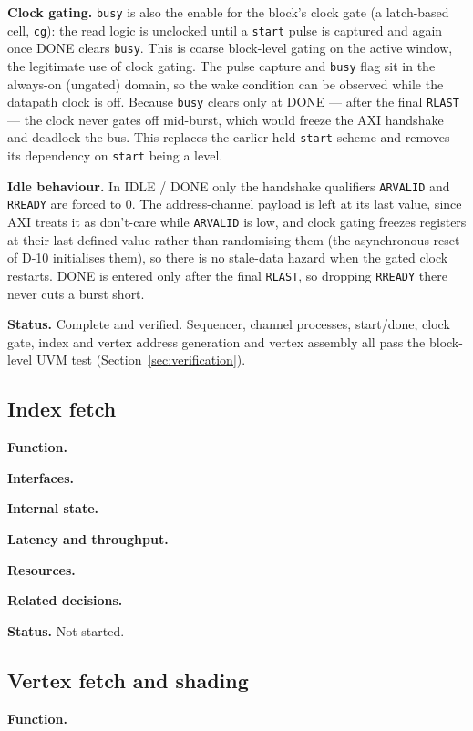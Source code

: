 \documentclass[11pt,a4paper]{article}
\newcommand{\field}[1]{\textbf{#1}\quad}
\begin{document}
\field{Clock gating.} \texttt{busy} is also the enable for the block's clock
gate (a latch-based cell, \texttt{cg}): the read logic is unclocked until a
\texttt{start} pulse is captured and again once DONE clears \texttt{busy}. This
is coarse block-level gating on the active window, the legitimate use of clock
gating. The pulse capture and \texttt{busy} flag sit in the always-on (ungated)
domain, so the wake condition can be observed while the datapath clock is off.
Because \texttt{busy} clears only at DONE --- after the final \texttt{RLAST} ---
the clock never gates off mid-burst, which would freeze the AXI handshake and
deadlock the bus. This replaces the earlier held-\texttt{start} scheme and
removes its dependency on \texttt{start} being a level.

\field{Idle behaviour.} In IDLE / DONE only the handshake qualifiers
\texttt{ARVALID} and \texttt{RREADY} are forced to 0. The address-channel
payload is left at its last value, since AXI treats it as don't-care while
\texttt{ARVALID} is low, and clock gating freezes registers at their last
defined value rather than randomising them (the asynchronous reset of D-10
initialises them), so there is no stale-data hazard when the gated clock
restarts. DONE is entered only after the final \texttt{RLAST}, so dropping
\texttt{RREADY} there never cuts a burst short.

\field{Status.} Complete and verified. Sequencer, channel processes, start/done,
clock gate, index and vertex address generation and vertex assembly all pass the
block-level UVM test (Section~\ref{sec:verification}).

\subsection{Index fetch}
\field{Function.} %

\field{Interfaces.} %

\field{Internal state.} %

\field{Latency and throughput.} %

\field{Resources.} %

\field{Related decisions.} ---

\field{Status.} Not started.

\subsection{Vertex fetch and shading}
\field{Function.} %
\end{document}

